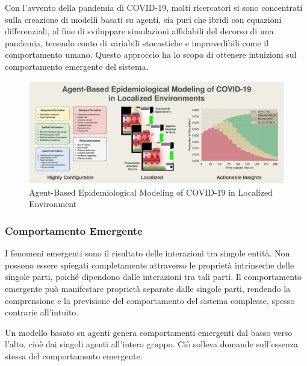 Con l'avvento della pandemia di COVID-19, molti ricercatori si sono 
concentrati sulla creazione di modelli basati su agenti, sia puri che 
ibridi con equazioni differenziali, al fine di sviluppare simulazioni 
affidabili del decorso di una pandemia, tenendo conto di variabili 
stocastiche e imprevedibili come il comportamento umano. Questo approccio 
ha lo scopo di ottenere intuizioni sul comportamento emergente del sistema.

\begin{figure}[H]
    \begin{center}
        \includegraphics[width=\textwidth]{img/1-s2.0-S0010482522001883-ga1.jpg}
        \caption{Agent-Based Epidemiological Modeling of COVID-19 in Localized Environment \cite{CIUNKIEWICZ2022105396}}
        \label{fig:abm_covid}
    \end{center}
\end{figure}

\subsubsection{Comportamento Emergente}

I fenomeni emergenti sono il risultato delle interazioni tra singole entità. 
Non possono essere spiegati completamente attraverso le proprietà 
intrinseche delle singole parti, poiché dipendono dalle interazioni tra 
tali parti. Il comportamento emergente può manifestare proprietà separate 
dalle singole parti, rendendo la comprensione e la previsione del 
comportamento del sistema complesse, spesso contrarie all'intuito.

Un modello basato su agenti genera comportamenti emergenti dal basso verso 
l'alto, cioè dai singoli agenti all'intero gruppo. Ciò solleva domande 
sull'essenza stessa del comportamento emergente.

